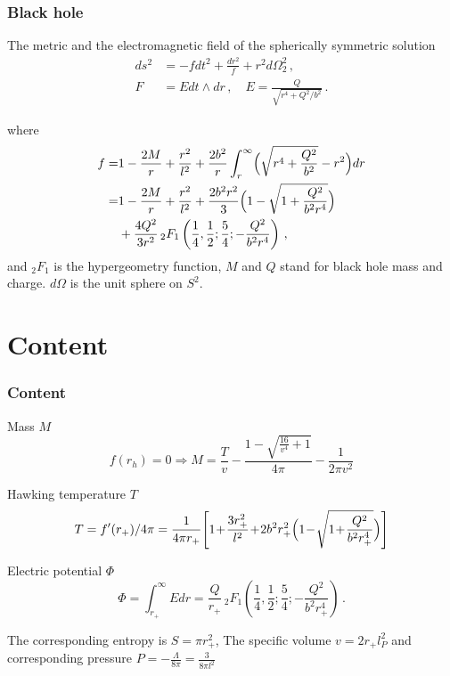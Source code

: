 \documentclass[9pt, dvipsnames]{beamer}
\begin{document}
\begin{frame}
\frametitle{\textbf{Black hole}}
\begin{exampleblock}{The metric and the electromagnetic field of the spherically symmetric solution}
\begin{align}
    ds^2&=-fdt^2+\frac{dr^2}{f}+r^2 d\Omega_2^2\,,\label{BImetric}\\
    F&=Edt\wedge dr\label{BIE}\,, \quad E=\frac{Q}{\sqrt{r^4+Q^2/b^2}}\,.
\end{align}
\end{exampleblock}
where
\begin{equation}
\begin{split}
    f=&1-\frac{2M}{r}+\frac{r^2}{l^2}+\frac{2b^2}{r}\int_r^\infty \Bigl(\sqrt{r^4+\frac{Q^2}{b^2}}-r^2\Bigr)dr\nonumber\\
    =&1-\frac{2M}{r}+\frac{r^2}{l^2}+\frac{2b^2 r^2}{3}\Bigl(1-\sqrt{1+\frac{Q^2}{b^2 r^4}}\Bigr)\nonumber\\
    &+\frac{4Q^2}{3r^2}\,{}_2 F_1\left(\frac{1}{4},\frac{1}{2}; \frac{5}{4};-\frac{Q^2}{b^2 r^4}\right)\,,
\end{split}
\end{equation}
and $_2 F_1$ is the hypergeometry function, $M$ and $Q$ stand for black hole mass and charge. $d\Omega$ is the unit sphere on $S^2$.
\end{frame}

\section{Content}\label{sec:content}
\begin{frame}
\frametitle{\textbf{Content}}
\begin{block}{Mass $M$}
\begin{equation}
    f(r_h) = 0 \Longrightarrow M = \frac{T}{v}-\frac{1-\sqrt{\frac{16}{v^4}+1}}{4 \pi }-\frac{1}{2 \pi  v^2}
\end{equation}
\end{block}
    
\begin{exampleblock}{Hawking temperature $T$}
\begin{equation}\label{eq:T}
    T = f^{\prime}(r_+) / 4 \pi = \frac{1}{4\pi r_+}\!\left[1\!+\!\frac{3r_+^2}{l^2}\!+\!2b^2 r_+^2\Bigl(1\!-\!\sqrt{1\!+\!\frac{Q^2}{b^2 r_+^4}}\Bigr)\right]
\end{equation}
\end{exampleblock}
    
\begin{alertblock}{Electric potential $\Phi$}
\begin{equation}
    \Phi=\int_{r_+}^\infty E dr
    =\frac{Q}{r_+}\,{}_2 F_1\!\left(\frac{1}{4},\frac{1}{2};\frac{5}{4};-\frac{Q^2}{b^2 r_+^4}\right)\,.
\end{equation}
\end{alertblock}
    
The corresponding entropy is $S = \pi r_+^2$, The specific volume $v = 2 r_+ l_P^2$ and corresponding pressure $P = - \frac{\Lambda}{8 \pi} = \frac{3}{8 \pi l^2}$
\end{frame}
\end{document}
